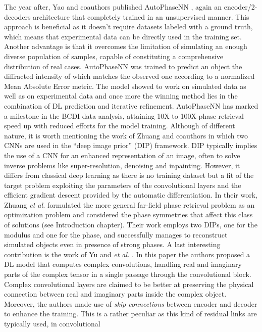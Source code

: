 The year after, Yao and coauthors published AutoPhaseNN \cite{yao_autophasenn_2022}, again an encoder/2-decoders architecture
that completely trained in an unsupervised manner. This approach is beneficial as it doesn't require datasets labeled with 
a ground truth, which means that experimental data can be directly used in the training set. Another advantage is that it 
overcomes the limitation of simulating an enough diverse population of samples, capable of constituting a comprehensive 
distribution of real cases. AutoPhaseNN was trained to predict an object the diffracted intensity of which matches the observed
one according to a normalized Mean Absolute Error metric. The model showed to work on simulated data as well as on experimental 
data and once more the winning method lies in the combination of DL prediction and iterative refinement. 
AutoPhaseNN has marked a milestone in the BCDI data analysis, attaining 10X to 100X phase retrieval speed up with reduced efforts 
for the model training. 
Although of different nature, it is worth mentioning the work of Zhuang and coauthors \cite{Zhuang2022PracticalPR} in which 
two CNNs are used in the ``deep image prior'' (DIP) framework. DIP \cite{Ulyanov_2020} typically implies the use of a CNN for 
an enhanced representation of an image, often to solve inverse problems like super-resolution, denoising and inpainting. 
However, it differs from classical deep learning as there is no training dataset but a fit of the target problem exploiting
the parameters of the convolutional layers and the efficient gradient descent provided by the automatic differentiation. 
In their work, Zhuang \textit{et al.} formulated the more general far-field phase retrieval problem as an optimization problem 
and considered the phase symmetries that affect this class of solutions (see Introduction chapter). Their work employs two 
DIPs, one for the modulus and one for the phase, and successfully manages to reconstruct simulated objects even in presence 
of strong phases. 
A last interesting contribution is the work of Yu and \textit{et al.} \cite{yu_ultrafast_2024}. In this paper the authors
proposed a DL model that computes complex convolutions, handling real and imaginary parts of the complex tensor in a single
passage through the convolutional block. Complex convolutional layers are claimed to be better at preserving the physical connection between real and imaginary parts  
inside the complex object. Moreover, the authors made use of \textit{skip connections} between encoder and decoder to 
enhance the training. This is a rather peculiar as this kind of residual links are typically used, in convolutional 
